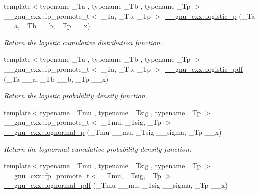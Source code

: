 \begin{DoxyCompactItemize}
\item 
{\footnotesize template$<$typename \+\_\+\+Ta , typename \+\_\+\+Tb , typename \+\_\+\+Tp $>$ }\\\+\_\+\+\_\+gnu\+\_\+cxx\+::fp\+\_\+promote\+\_\+t$<$ \+\_\+\+Ta, \+\_\+\+Tb, \+\_\+\+Tp $>$ \hyperlink{group__mathsf__gnu_ga5a5d9c5e7ab822f84578415be8609f49}{\+\_\+\+\_\+gnu\+\_\+cxx\+::logistic\+\_\+p} (\+\_\+\+Ta \+\_\+\+\_\+a, \+\_\+\+Tb \+\_\+\+\_\+b, \+\_\+\+Tp \+\_\+\+\_\+x)
\begin{DoxyCompactList}\small\item\em Return the logistic cumulative distribution function. \end{DoxyCompactList}\item 
{\footnotesize template$<$typename \+\_\+\+Ta , typename \+\_\+\+Tb , typename \+\_\+\+Tp $>$ }\\\+\_\+\+\_\+gnu\+\_\+cxx\+::fp\+\_\+promote\+\_\+t$<$ \+\_\+\+Ta, \+\_\+\+Tb, \+\_\+\+Tp $>$ \hyperlink{group__mathsf__gnu_gaeb3e768c11c8cd11804827a09f19b1e3}{\+\_\+\+\_\+gnu\+\_\+cxx\+::logistic\+\_\+pdf} (\+\_\+\+Ta \+\_\+\+\_\+a, \+\_\+\+Tb \+\_\+\+\_\+b, \+\_\+\+Tp \+\_\+\+\_\+x)
\begin{DoxyCompactList}\small\item\em Return the logistic probability density function. \end{DoxyCompactList}\item 
{\footnotesize template$<$typename \+\_\+\+Tmu , typename \+\_\+\+Tsig , typename \+\_\+\+Tp $>$ }\\\+\_\+\+\_\+gnu\+\_\+cxx\+::fp\+\_\+promote\+\_\+t$<$ \+\_\+\+Tmu, \+\_\+\+Tsig, \+\_\+\+Tp $>$ \hyperlink{group__mathsf__gnu_ga3bbd4feb10f2d745bf8aca8748099c53}{\+\_\+\+\_\+gnu\+\_\+cxx\+::lognormal\+\_\+p} (\+\_\+\+Tmu \+\_\+\+\_\+mu, \+\_\+\+Tsig \+\_\+\+\_\+sigma, \+\_\+\+Tp \+\_\+\+\_\+x)
\begin{DoxyCompactList}\small\item\em Return the lognormal cumulative probability density function. \end{DoxyCompactList}\item 
{\footnotesize template$<$typename \+\_\+\+Tmu , typename \+\_\+\+Tsig , typename \+\_\+\+Tp $>$ }\\\+\_\+\+\_\+gnu\+\_\+cxx\+::fp\+\_\+promote\+\_\+t$<$ \+\_\+\+Tmu, \+\_\+\+Tsig, \+\_\+\+Tp $>$ \hyperlink{group__mathsf__gnu_gaef4db41e58e53144df2ddcc834d88e0b}{\+\_\+\+\_\+gnu\+\_\+cxx\+::lognormal\+\_\+pdf} (\+\_\+\+Tmu \+\_\+\+\_\+mu, \+\_\+\+Tsig \+\_\+\+\_\+sigma, \+\_\+\+Tp \+\_\+\+\_\+x)

\end{DoxyCompactItemize}

